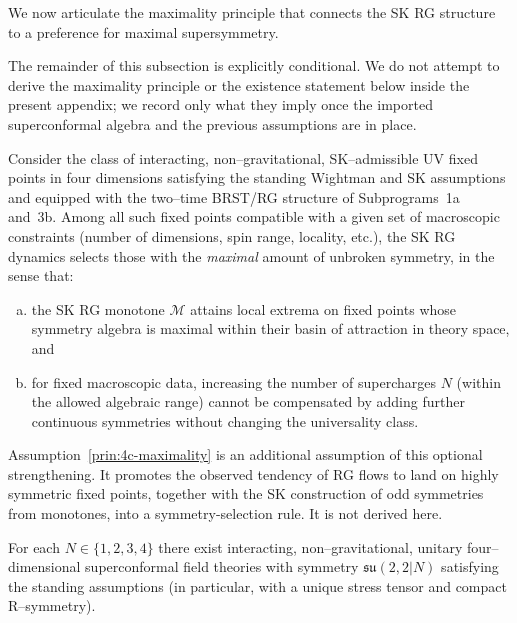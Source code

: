 We now articulate the maximality principle that connects the SK RG
structure to a preference for maximal supersymmetry.

The remainder of this subsection is explicitly conditional. We do not
attempt to derive the maximality principle or the existence statement
below inside the present appendix; we record only what they imply once
the imported superconformal algebra and the previous assumptions are in
place.

\begin{assumption}
\label{prin:4c-maximality}
Consider the class of interacting, non–gravitational, SK–admissible UV
fixed points in four dimensions satisfying the standing Wightman and SK
assumptions and equipped with the two–time BRST/RG structure of
Subprograms~1a and~3b.  Among all such fixed points compatible with a given set
of macroscopic constraints (number of dimensions, spin range, locality,
etc.), the SK RG dynamics selects those with the \emph{maximal} amount
of unbroken symmetry, in the sense that:
\begin{enumerate}[(a)]
  \item the SK RG monotone \(\mathcal M\) attains local extrema on
        fixed points whose symmetry algebra is maximal within their
        basin of attraction in theory space, and

  \item for fixed macroscopic data, increasing the number of
        supercharges \(N\) (within the allowed algebraic range) cannot
        be compensated by adding further continuous symmetries without
        changing the universality class.
\end{enumerate}
\end{assumption}

Assumption~\ref{prin:4c-maximality} is an additional assumption of this
optional strengthening. It promotes the observed tendency of RG flows to land on
highly symmetric fixed points, together with the SK construction of odd
symmetries from monotones, into a symmetry-selection rule. It is not
derived here.

\begin{assumption}
\label{ass:4c-existence}
For each \(N\in\{1,2,3,4\}\) there exist interacting, non–gravitational,
unitary four–dimensional superconformal field theories with symmetry
\(\mathfrak{su}(2,2|N)\) satisfying the standing assumptions (in
particular, with a unique stress tensor and compact R–symmetry).
\end{assumption}

